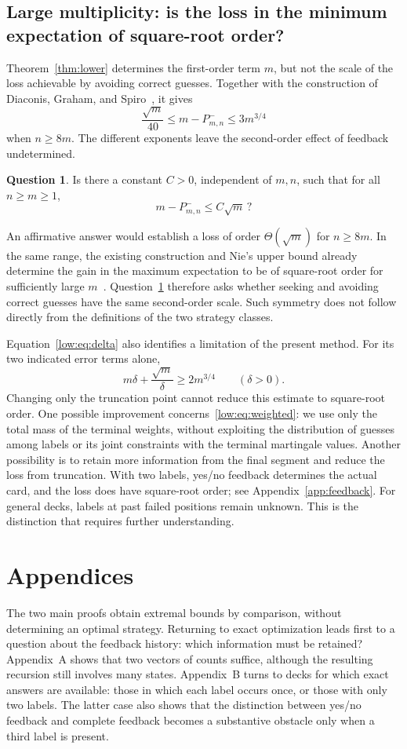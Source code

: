 \documentclass[11pt,reqno]{amsart}
\numberwithin{equation}{section}
\theoremstyle{remark}
\theoremstyle{definition}
\newtheorem{question}[theorem]{Question}
\begin{document}
\subsection{Large multiplicity: is the loss in the minimum expectation of square-root order?}
Theorem~\ref{thm:lower} determines the first-order term $m$, but not the scale of the loss achievable by avoiding correct guesses. Together with the construction of Diaconis, Graham, and Spiro~\cite[Theorem~1]{DGS}, it gives
\[
 \frac{\sqrt m}{40}
 \le m-P^-_{m,n}
 \le 3m^{3/4}
\]
when $n\ge8m$. The different exponents leave the second-order effect of feedback undetermined.
\begin{question}\label{question:sqrt}
Is there a constant $C>0$, independent of $m,n$, such that for all $n\ge m\ge1$,
\[
 m-P^-_{m,n}\le C\sqrt m\,?
\]
\end{question}
An affirmative answer would establish a loss of order $\Theta(\sqrt m)$ for $n\ge8m$. In the same range, the existing construction and Nie's upper bound already determine the gain in the maximum expectation to be of square-root order for sufficiently large $m$~\cite{DGS,Nie}. Question~\ref{question:sqrt} therefore asks whether seeking and avoiding correct guesses have the same second-order scale. Such symmetry does not follow directly from the definitions of the two strategy classes.

Equation~\eqref{low:eq:delta} also identifies a limitation of the present method. For its two indicated error terms alone,
\[
 m\delta+\frac{\sqrt m}{\delta}\ge2m^{3/4}
 \qquad(\delta>0).
\]
Changing only the truncation point cannot reduce this estimate to square-root order. One possible improvement concerns~\eqref{low:eq:weighted}: we use only the total mass of the terminal weights, without exploiting the distribution of guesses among labels or its joint constraints with the terminal martingale values. Another possibility is to retain more information from the final segment and reduce the loss from truncation. With two labels, yes/no feedback determines the actual card, and the loss does have square-root order; see Appendix~\ref{app:feedback}. For general decks, labels at past failed positions remain unknown. This is the distinction that requires further understanding.

\clearpage
\appendix
\section*{Appendices}
The two main proofs obtain extremal bounds by comparison, without determining an optimal strategy. Returning to exact optimization leads first to a question about the feedback history: which information must be retained? Appendix~A shows that two vectors of counts suffice, although the resulting recursion still involves many states. Appendix~B turns to decks for which exact answers are available: those in which each label occurs once, or those with only two labels. The latter case also shows that the distinction between yes/no feedback and complete feedback becomes a substantive obstacle only when a third label is present.
\end{document}
